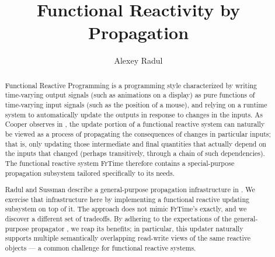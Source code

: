 \documentclass[12pt]{article}
\title{Functional Reactivity by Propagation}
\author{Alexey Radul}
\begin{document}
\maketitle

\begin{abstract}
Functional Reactive Programming \cite{elliott-hudak-1997-fran, wan-hudak-2000-frp-first-principles,
  nilsson-2002-frp, cooper-2008-thesis} is a programming style characterized
by writing time-varying output signals (such as animations on a
display) as pure functions of time-varying input signals (such as the
position of a mouse), and relying on a runtime system to automatically
update the outputs in response to changes in the inputs.  As Cooper
observes in \cite{cooper-krishnamurthi-2006-frtime, cooper-2008-thesis}, the update portion of
a functional reactive system can naturally be viewed as a process of
propagating the consequences of changes in particular inputs; that is,
only updating those intermediate and final quantities that actually
depend on the inputs that changed (perhaps transitively, through a
chain of such dependencies).  The functional reactive system FrTime
\cite{cooper-krishnamurthi-2004-frtime,
  cooper-krishnamurthi-2006-frtime, cooper-2008-thesis} therefore contains
a special-purpose propagation subsystem tailored specifically to its
needs.

Radul and Sussman describe a general-purpose propagation
infrastructure in \cite{art}.  We exercise that
infrastructure here by implementing a functional reactive updating
subsystem on top of it.  The approach does not mimic FrTime's exactly,
and we discover a different set of tradeoffs.  By adhering to the
expectations of the general-purpose propagator \cite{art}, we
reap its benefits; in particular, this updater naturally supports
multiple semantically overlapping read-write views of the same
reactive objects --- a common challenge \cite{?} for functional
reactive systems.
\end{abstract}



\end{document}
